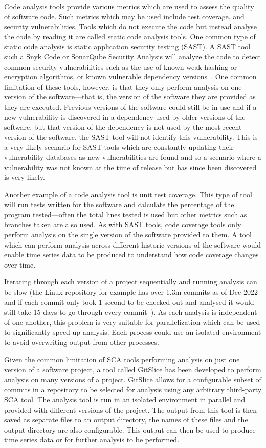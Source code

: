 Code analysis tools provide various metrics which are used to assess the quality of software code.
Such metrics which may be used include test coverage, and security vulnerabilities.
Tools which do not execute the code but instead analyse the code by reading it are called static code analysis tools.
One common type of static code analysis is static application security testing (SAST).
A SAST tool such a Snyk Code or SonarQube Security Analysis will analyze the code to detect common security vulnerabilities such as the use of known weak hashing or encryption algorithms, or known vulnerable dependency versions~\cite{scat}.
One common limitation of these tools, however, is that they only perform analysis on one version of the software---that is, the version of the software they are provided as they are executed.
Previous versions of the software could still be in use and if a new vulnerability is discovered in a dependency used by older versions of the software, but that version of the dependency is not used by the most recent version of the software, the SAST tool will not identify this vulnerability.
This is a very likely scenario for SAST tools which are constantly updating their vulnerability databases as new vulnerabilities are found and so a scenario where a vulnerability was not known at the time of release but has since been discovered is very likely.

Another example of a code analysis tool is unit test coverage.
This type of tool will run tests written for the software and calculate the percentage of the program tested---often the total lines tested is used but other metrics such as branches taken are also used.
As with SAST tools, code coverage tools only perform analysis on the single version of the software provided to them.
A tool which can perform analysis across different historic versions of the software would enable time series data to be produced to understand how code coverage changes over time.

Iterating through each version of a project sequentially and running analysis can be slow (the Linux repository for example has over 1.3m commits as of Dec 2022 and if each commit only took 1 second to be checked out and analysed it would still take 15 days to go through every commit~\cite{linux_git}).
As each analysis is independent of one another, this problem is very suitable for parallelization which can be used to significantly speed up analysis.
Each process could use an isolated environment to avoid overwriting output from other processes.

Given the common limitation of SCA tools performing analysis on just one version of a software project, a tool called GitSlice has been developed to perform analysis on many versions of a project.
GitSlice allows for a configurable subset of commits in a repository to be selected for analysis using any arbitrary third-party SCA tool.
The analysis tool is run in an isolated environment in parallel and provided with different versions of the project.
The output from this tool is then saved as separate files to an output directory, the names of these files and the output directory are also configurable.
This output can then be used to produce time series data or for further analysis to be performed.
